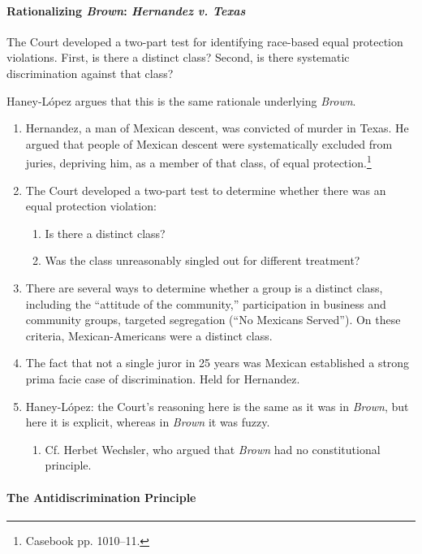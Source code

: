 \paragraph{Rationalizing \emph{Brown}: \emph{Hernandez v. Texas}}

The Court developed a two-part test for identifying race-based equal 
protection violations. First, is there a distinct class? Second, is there 
systematic discrimination against that class?

Haney-L\'{o}pez argues that this is the same rationale underlying 
\emph{Brown}.

\begin{enumerate}
    \item Hernandez, a man of Mexican descent, was convicted of murder in 
    Texas. He argued that people of Mexican descent were systematically 
    excluded from juries, depriving him, as a member of that class, of equal 
    protection.\footnote{Casebook pp. 1010--11.}
    \item The Court developed a two-part test to determine whether there was 
    an equal protection violation:
    \begin{enumerate}
        \item Is there a distinct class?
        \item Was the class unreasonably singled out for different treatment?
    \end{enumerate}
    \item There are several ways to determine whether a group is a distinct 
    class, including the ``attitude of the community,'' participation in 
    business and community groups, targeted segregation (``No Mexicans 
    Served''). On these criteria, Mexican-Americans were a distinct class.
    \item The fact that not a single juror in 25 years was Mexican established 
    a strong prima facie case of discrimination. Held for Hernandez.
    \item Haney-L\'{o}pez: the Court's reasoning here is the same as it was in 
    \emph{Brown}, but here it is explicit, whereas in \emph{Brown} it was 
    fuzzy.
    \begin{enumerate}
        \item Cf. Herbet Wechsler, who argued that \emph{Brown} had no 
        constitutional principle.
    \end{enumerate}
\end{enumerate}

\paragraph{The Antidiscrimination Principle}

